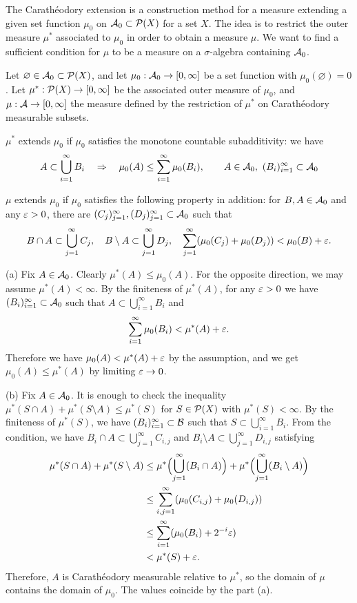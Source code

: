 \documentclass{../../large}
\begin{document}
\begin{prb}
The Carath\'eodory extension is a construction method for a measure extending a given set function $\mu_0$ on $\mathcal{A}_0\subset\mathcal{P}(X)$ for a set $X$.
The idea is to restrict the outer measure $\mu^*$ associated to $\mu_0$ in order to obtain a measure $\mu$.
We want to find a sufficient condition for $\mu$ to be a measure on a $\sigma$-algebra containing $\mathcal{A}_0$.

Let $\varnothing\in\mathcal{A}_0\subset\mathcal{P}(X)$, and let $\mu_0:\mathcal{A}_0\to[0,\infty]$ be a set function with $\mu_0(\varnothing)=0$.
Let $\mu^*:\mathcal{P}(X)\to[0,\infty]$ be the associated outer measure of $\mu_0$, and $\mu:\mathcal{A}\to[0,\infty]$ the measure defined by the restriction of $\mu^*$ on Carath\'eodory measurable subsets.
\begin{parts}
\item
$\mu^*$ extends $\mu_0$ if $\mu_0$ satisfies the monotone countable subadditivity: we have
\[A\subset\bigcup_{i=1}^\infty B_i\quad\Rightarrow\quad\mu_0(A)\le\sum_{i=1}^\infty\mu_0(B_i),\qquad A\in\mathcal{A}_0,\ (B_i)_{i=1}^\infty\subset\mathcal{A}_0\]
\item
$\mu$ extends $\mu_0$ if $\mu_0$ satisfies the following property in addition: for $B,A\in\mathcal{A}_0$ and any $\varepsilon>0$, there are $(C_j)_{j=1}^\infty,(D_j)_{j=1}^\infty\subset\mathcal{A}_0$ such that
\[B\cap A\subset\bigcup_{j=1}^\infty C_j,\quad B\setminus A\subset\bigcup_{j=1}^\infty D_j,\quad\sum_{j=1}^\infty(\mu_0(C_j)+\mu_0(D_j))<\mu_0(B)+\varepsilon.\]
\end{parts}
\end{prb}
\begin{pf}
(a)
Fix $A\in\mathcal{A}_0$.
Clearly $\mu^*(A)\le\mu_0(A)$.
For the opposite direction, we may assume $\mu^*(A)<\infty$.
By the finiteness of $\mu^*(A)$, for any $\varepsilon>0$ we have $(B_i)_{i=1}^\infty\subset\mathcal{A}_0$ such that $A\subset\bigcup_{i=1}^\infty B_i$ and
\[\sum_{i=1}^\infty\mu_0(B_i)<\mu^*(A)+\varepsilon.\]
Therefore we have $\mu_0(A)<\mu^*(A)+\varepsilon$ by the assumption, and we get $\mu_0(A)\le\mu^*(A)$ by limiting $\varepsilon\to0$.

(b)
Fix $A\in\mathcal{A}_0$.
It is enough to check the inequality $\mu^*(S\cap A)+\mu^*(S\setminus A)\le\mu^*(S)$ for $S\in\mathcal{P}(X)$ with $\mu^*(S)<\infty$.
By the finiteness of $\mu^*(S)$, we have $(B_i)_{i=1}^\infty\subset\mathcal{B}$ such that $S\subset\bigcup_{i=1}^\infty B_i$.
From the condition, we have $B_i\cap A\subset\bigcup_{j=1}^\infty C_{i,j}$ and $B_i\setminus A\subset\bigcup_{j=1}^\infty D_{i,j}$ satisfying
\begin{align*}
\mu^*(S\cap A)+\mu^*(S\setminus A)
&\le\mu^*\Bigl(\bigcup_{j=1}^\infty(B_i\cap A)\Bigr)+\mu^*\Bigl(\bigcup_{j=1}^\infty(B_i\setminus A)\Bigr)\\
&\le\sum_{i,j=1}^\infty(\mu_0(C_{i,j})+\mu_0(D_{i,j}))\\
&\le\sum_{i=1}^\infty(\mu_0(B_i)+2^{-i}\varepsilon)\\
&<\mu^*(S)+\varepsilon.
\end{align*}
Therefore, $A$ is Carath\'eodory measurable relative to $\mu^*$, so the domain of $\mu$ contains the domain of $\mu_0$.
The values coincide by the part (a).
\end{pf}
\end{document}
